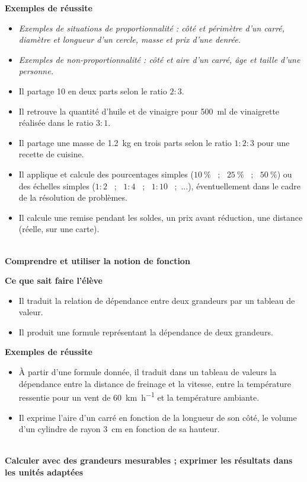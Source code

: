 \documentclass[10pt]{article}
\newcommand{\RR}{\begin{tikzpicture} \draw[Bleu,fill=Bleu] (0,0) circle (0.06); \end{tikzpicture}}
\newcommand{\LR}{\begin{tikzpicture} \draw[Bleu,fill=Bleu] (0.05,0) -- (0,0.075) -- (-0.05,0) -- (0,-0.075) --cycle; \end{tikzpicture}}
\newcommand{\competence}[1]{\par\color{Bleu}\makebox[\linewidth]{\rule{\textwidth}{2pt}}\\{\bfseries\Large#1}\color{black}\vspace{1em}}
\newenvironment{savoireleves}{%
    \renewcommand{\labelitemi}{\RR}%
    \color{black}%
    \par\textbf{Ce que sait faire l'élève}
    \begin{itemize}
    \setlength{\itemsep}{-0.2em}%
}{
    \end{itemize}
}
\newenvironment{exemplesreussite}{%
    \renewcommand{\labelitemi}{\LR}%
    \renewcommand{\labelitemii}{-}%
    \color{black}%
    \par\textbf{Exemples de réussite}
    \begin{itemize}
    \setlength{\itemsep}{-0.2em}%
}{
    \end{itemize}
}
\begin{document}
    \begin{exemplesreussite}
        \item[] \textit{Exemples de situations de proportionnalité : côté et périmètre d’un carré, diamètre et longueur d’un cercle, masse et prix d’une denrée.}
        \item[] \textit{Exemples de non-proportionnalité : côté et aire d’un carré, âge et taille d’une personne.}
        \item Il partage \qty{10}{\EURO} en deux parts selon le ratio $2:3$.
        \item Il retrouve la quantité d’huile et de vinaigre pour \qty{500}{\milli\litre} de vinaigrette réalisée dans le ratio $3:1$.
        \item Il partage une masse de \qty{1,2}{\kilo\gram} en trois parts selon le ratio $1:2:3$ pour une recette de cuisine.
        \item Il applique et calcule des pourcentages simples ($10~\%$ ~;~ $25~\%$ ~;~ $50~\%$) ou des échelles simples ($1:2$ ~;~ $1:4$ ~;~ $1:10$ ~;~...), éventuellement dans le cadre de la résolution de problèmes.
        \item Il calcule une remise pendant les soldes, un prix avant réduction, une distance (réelle, sur une carte).
    \end{exemplesreussite}

    \competence{Comprendre et utiliser la notion de fonction}
    \begin{savoireleves}
        \item Il traduit la relation de dépendance entre deux grandeurs par un tableau de valeur.
        \item Il produit une formule représentant la dépendance de deux grandeurs.
    \end{savoireleves}
    \begin{exemplesreussite}
        \item À partir d’une formule donnée, il traduit dans un tableau de valeurs la dépendance entre la distance de freinage et la vitesse, entre la température ressentie pour un vent de \qty{60}{\kilo\metre\per\hour} et la température ambiante.
        \item Il exprime l’aire d’un carré en fonction de la longueur de son côté, le volume d’un cylindre de rayon \qty{3}{\centi\metre} en fonction de sa hauteur.
    \end{exemplesreussite}

    \clearpage
    \competence{Calculer avec des grandeurs mesurables ; exprimer les résultats dans les unités adaptées}
\end{document}
